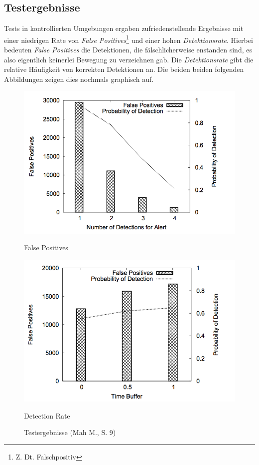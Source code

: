 \subsection{Testergebnisse}
 Tests in kontrollierten Umgebungen ergaben zufriedenstellende Ergebnisse mit einer niedrigen Rate von \textit{False Positives}\footnote{Z. Dt. Falschpositiv} und einer hohen \textit{Detektionsrate}. Hierbei bedeuten \textit{False Positives} die Detektionen, die fälschlicherweise enstanden sind, es also eigentlich keinerlei Bewegung zu verzeichnen gab. Die \textit{Detektionsrate} gibt die relative Häufigkeit von korrekten Detektionen an. Die beiden beiden folgenden Abbildungen zeigen dies nochmals graphisch auf.

\begin{figure}[H]
\centering
\begin{minipage}{.5\textwidth}
  \centering
  \includegraphics[scale=0.6]{pictures/false_pos}
  \caption*{False Positives}
\end{minipage}%
\begin{minipage}{.5\textwidth}
  \centering
  \includegraphics[scale=0.6]{pictures/detection}
  \caption*{Detection Rate}
\end{minipage}
\caption{Testergebnisse (Mah M., S. 9)}
\end{figure}

